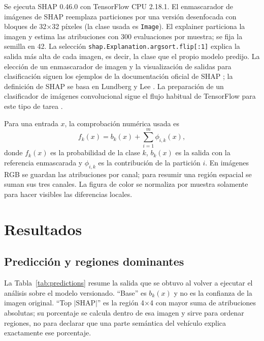 \documentclass[11pt,a4paper]{article}
\begin{document}
Se ejecuta SHAP 0.46.0 con TensorFlow CPU 2.18.1. El enmascarador de imágenes
de SHAP reemplaza particiones por una versión desenfocada con bloques de
32$\times$32 píxeles (la clase usada es \texttt{Image}). El explainer particiona la imagen y estima
las atribuciones con 300 evaluaciones por muestra; se fija la semilla en 42.
La selección \texttt{shap.Explanation.argsort.flip[:1]} explica la salida más
alta de cada imagen, es decir, la clase que el propio modelo predijo. La
elección de un enmascarador de imagen y la visualización de salidas para
clasificación siguen los ejemplos de la documentación oficial de SHAP
\cite{shap_image_docs}; la definición de SHAP se basa en Lundberg y Lee
\cite{lundberg2017unified}. La preparación de un clasificador de imágenes
convolucional sigue el flujo habitual de TensorFlow para este tipo de tarea
\cite{tensorflow_image_classification}.

Para una entrada $x$, la comprobación numérica usada es
\begin{equation}
  f_k(x) = b_k(x) + \sum_{i=1}^{m}\phi_{i,k}(x),
  \label{eq:additivity}
\end{equation}
donde $f_k(x)$ es la probabilidad de la clase $k$, $b_k(x)$ es la salida con
la referencia enmascarada y $\phi_{i,k}$ es la contribución de la partición
$i$. En imágenes RGB se guardan las atribuciones por canal; para resumir una
región espacial se suman sus tres canales. La figura de color se normaliza por
muestra solamente para hacer visibles las diferencias locales.

\section{Resultados}

\subsection{Predicción y regiones dominantes}

La Tabla~\ref{tab:predictions} resume la salida que se obtuvo al volver a
ejecutar el análisis sobre el modelo versionado. ``Base'' es $b_k(x)$ y no es
la confianza de la imagen original. ``Top $|\text{SHAP}|$'' es la región 4$\times$4
con mayor suma de atribuciones absolutas; su porcentaje se calcula dentro de
esa imagen y sirve para ordenar regiones, no para declarar que una parte
semántica del vehículo explica exactamente ese porcentaje.
\end{document}
